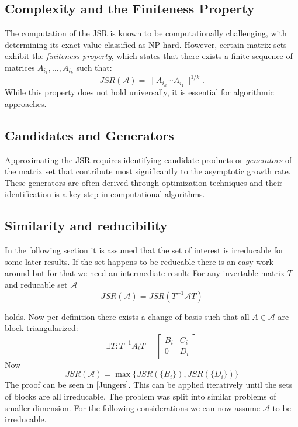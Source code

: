 \subsection*{Complexity and the Finiteness Property}
The computation of the JSR is known to be computationally challenging, with determining its exact value classified as NP-hard. However, certain matrix sets exhibit the \emph{finiteness property}, which states that there exists a finite sequence of matrices $A_{i_1}, \dots, A_{i_k}$ such that:
\begin{equation}
    JSR(\mathcal{A}) = \|A_{i_k} \cdots A_{i_1}\|^{1/k}.
\end{equation}
While this property does not hold universally, it is essential for algorithmic approaches.

\subsection*{Candidates and Generators}
Approximating the JSR requires identifying candidate products or \emph{generators} of the matrix set that contribute most significantly to the asymptotic growth rate. These generators are often derived through optimization techniques and their identification is a key step in computational algorithms.

\subsection*{Similarity and reducibility}
In the following section it is assumed that the set of interest is irreducable for some later results. If the set happens to be reducable there is an easy work-around but for that we need an intermediate result: 
For any invertable matrix $T$ and reducable set $\mathcal{A}$
\begin{equation}
   JSR(\mathcal{A}) = JSR(T^{-1}\mathcal{A}T) 
\end{equation}

holds. Now per definition there exists a change of basis such that all $A \in \mathcal{A}$ are block-triangularized: 
$$\exists T: T^{-1}A_{i}T = 
\begin{bmatrix}
B_i & C_i  \\
0 & D_i
\end{bmatrix}
$$
Now 
\begin{equation}
    JSR(\mathcal{A}) = \max\{JSR(\{B_i\}), JSR(\{D_i\})\}
\end{equation}
The proof can be seen in [Jungers].
This can be applied iteratively until the sets of blocks are all irreducable.
The problem was split into similar problems of smaller dimension.
For the following considerations we can now assume $\mathcal{A}$ to be irreducable.

